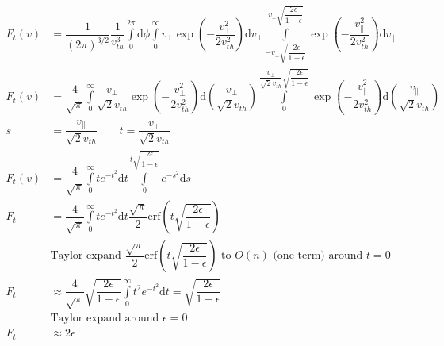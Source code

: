 \documentclass[10pt,a4paper]{article}
\begin{document}
	\begin{subequations}
		\begin{align}
			F_{t}(v) &= \dfrac{1}{(2 \pi)^{3/2}} \dfrac{1}{v_{th}^{3}} \int\limits_{0}^{2\pi} \mathrm{d}\phi \int\limits_{0}^{\infty} v_{\perp} \exp\left(- \dfrac{v_{\perp}^{2}}{2 v_{th}^{2}}\right) \mathrm{d}v_{\perp} \int\limits_{-v_{\perp} \sqrt{\dfrac{2\epsilon}{1-\epsilon}}}^{v_{\perp} \sqrt{\dfrac{2\epsilon}{1-\epsilon}}} \exp\left(- \dfrac{v_{\parallel}^{2}}{2 v_{th}^{2}}\right) \mathrm{d}v_{\parallel} \\
			F_{t}(v) &= \dfrac{4}{\sqrt{\pi}} \int\limits_{0}^{\infty} \dfrac{v_{\perp}}{\sqrt{2} v_{th}} \exp\left(- \dfrac{v_{\perp}^{2}}{2 v_{th}^{2}}\right) \mathrm{d}\left(\dfrac{v_{\perp}}{\sqrt{2} v_{th}}\right) \int\limits_{0}^{\dfrac{v_{\perp}}{\sqrt{2} v_{th}} \sqrt{\dfrac{2\epsilon}{1-\epsilon}}} \exp\left(- \dfrac{v_{\parallel}^{2}}{2 v_{th}^{2}}\right) \mathrm{d}\left(\dfrac{v_{\parallel}}{\sqrt{2} v_{th}}\right) \\
			s &= \dfrac{v_{\parallel}}{\sqrt{2} v_{th}} \qquad t = \dfrac{v_{\perp}}{\sqrt{2} v_{th}} \\
			F_{t}(v) &= \dfrac{4}{\sqrt{\pi}} \int\limits_{0}^{\infty} t e^{-t^{2}} \mathrm{d}t \int\limits_{0}^{t \sqrt{\dfrac{2\epsilon}{1-\epsilon}}} e^{-s^{2}} \mathrm{d}s \\
			F_{t} &= \dfrac{4}{\sqrt{\pi}} \int\limits_{0}^{\infty} t e^{-t^{2}} \mathrm{d}t \dfrac{\sqrt{\pi}}{2} \textrm{erf}\left(t \sqrt{\dfrac{2\epsilon}{1-\epsilon}}\right) \\
			&\textrm{Taylor expand } \dfrac{\sqrt{\pi}}{2}\textrm{erf}\left(t \sqrt{\dfrac{2\epsilon}{1-\epsilon}}\right) \textrm{ to $O(n)$ (one term) around } t = 0 \nonumber\\
			F_{t} &\approx \dfrac{4}{\sqrt{\pi}} \sqrt{\dfrac{2\epsilon}{1-\epsilon}} \int\limits_{0}^{\infty} t^{2} e^{-t^{2}} \mathrm{d}t = \sqrt{\dfrac{2\epsilon}{1-\epsilon}} \\
			&\textrm{Taylor expand around $\epsilon = 0$} \nonumber\\
			F_{t} &\approx 2\epsilon
		\end{align}
	\end{subequations}
	
\end{document}
